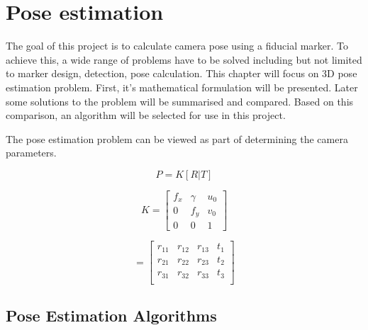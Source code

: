 \chapter{Pose estimation}\label{sect:pose}

The goal of this project is to calculate camera pose using a fiducial marker.
To achieve this, a wide range of problems have to be solved including but not limited to marker design, detection, pose calculation.
This chapter will focus on 3D pose estimation problem.
First, it's mathematical formulation will be presented.
Later some solutions to the problem will be summarised and compared.
Based on this comparison, an algorithm will be selected for use in this project.

The pose estimation problem can be viewed as part of determining the camera parameters.

\begin{equation}
	P = K [R|T]
\end{equation}

\begin{equation}
	K =
	\begin{bmatrix}
		f_x & \gamma & u_0 \\
		0   & f_y    & v_0 \\
		0   & 0      & 1
	\end{bmatrix}
\end{equation}

\begin{equation}
	[R | T] =
	\begin{bmatrix}
		r_{11} & r_{12} & r_{13} & t_1\\
		r_{21} & r_{22} & r_{23} & t_2\\
		r_{31} & r_{32} & r_{33} & t_3\\
	\end{bmatrix}
\end{equation}

\section{Pose Estimation Algorithms}

